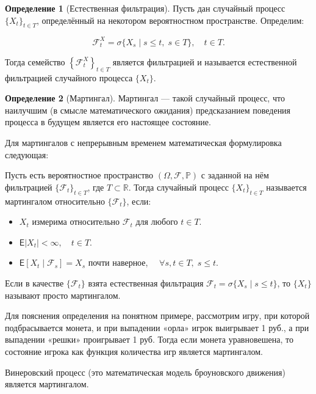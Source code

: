 \documentclass[a4paper,12pt]{article}
\theoremstyle{definition}
\newtheorem{definition}{Определение}[section]
\begin{document}
\begin{definition}[Естественная фильтрация]
    \label{def:natural_filtration}
    Пусть дан случайный процесс $\{X_{t}\}_{t\in T}$, определённый на некотором вероятностном пространстве. Определим:

    \begin{equation*}
        {\mathcal  {F}}_{t}^{X}=\sigma \{X_{s}\mid s\leq t,\;s\in T\},\quad t\in T.
    \end{equation*}
    
    Тогда семейство $\left\{{\mathcal  {F}}_{t}^{X}\right\}_{{t\in T}}$ является фильтрацией и называется естественной фильтрацией случайного процесса $\{X_{t}\}$.

\end{definition}

\begin{definition}[Мартингал]
    \label{def:martingale}
    Мартингал — такой случайный процесс, что наилучшим (в смысле математического ожидания) предсказанием поведения процесса в будущем является его настоящее состояние.
    
    Для мартингалов с непрерывным временем математическая формулировка следующая:
    
    Пусть есть вероятностное пространство $(\Omega ,{\mathcal {F}},\mathbb {P} )$ с заданной на нём фильтрацией $\{{\mathcal {F}}_{t}\}_{t\in T}$, где $T\subset \mathbb {R}$. Тогда случайный процесс $\{X_{t}\}_{t\in T}$ называется мартингалом относительно $\{{\mathcal {F}}_{t}\}$, если:
    
    \begin{itemize}
        \item $X_{t}$ измерима относительно ${\mathcal {F}}_{t}$ для любого $t\in T$.
        \item ${\mathsf {E}}|X_{t}|<\infty ,\quad t\in T$.
        \item ${\mathsf {E}}[X_{t}\mid {\mathcal {F}}_{s}]=X_{s}$ почти наверное, $\quad \forall s,t\in T,\;s\leq t.$
    \end{itemize}

    Если в качестве $\{{\mathcal {F}}_{t}\}$ взята естественная фильтрация ${\mathcal {F}}_{t}=\sigma \{X_{s}\mid s\leq t\}$, то $\{X_{t}\}$ называют просто мартингалом.
    
    Для пояснения определения на понятном примере, рассмотрим игру, при которой подбрасывается монета, и при выпадении «орла» игрок выигрывает 1 руб., а при выпадении «решки» проигрывает 1 руб. Тогда если монета уравновешена, то состояние игрока как функция количества игр является мартингалом.
    
    Винеровский процесс (это математическая модель броуновского движения) является мартингалом.

\end{definition}
\end{document}
